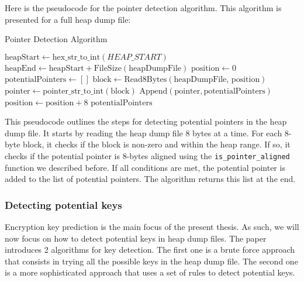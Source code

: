     Here is the pseudocode for the pointer detection algorithm. This algorithm is presented for a full heap dump file:

    \begin{algorithm}
        \caption{Pointer Detection Algorithm}
        \begin{algorithmic}[1]
            \State $\text{heapStart} \gets \text{hex\_str\_to\_int}(HEAP\_START)$
            \State $\text{heapEnd} \gets \text{heapStart} + \text{FileSize}(\text{heapDumpFile})$
            \State $\text{position} \gets 0$
            \State $\text{potentialPointers} \gets []$
                \State $\text{block} \gets \text{Read8Bytes}(\text{heapDumpFile, position})$
                    \State $\text{pointer} \gets \text{pointer\_str\_to\_int}(\text{block})$
                            \State $\text{Append}(\text{pointer}, \text{potentialPointers})$
                        \EndIf
                    \EndIf
                \EndIf
                \State $\text{position} \gets \text{position} + 8$
            \EndWhile
            \State \Return $\text{potentialPointers}$
        \EndProcedure
        \end{algorithmic}
    \end{algorithm}

    This pseudocode outlines the steps for detecting potential pointers in the heap dump file. It starts by reading the heap dump file 8 bytes at a time. For each 8-byte block, it checks if the block is non-zero and within the heap range. If so, it checks if the potential pointer is 8-bytes aligned using the \texttt{is\_pointer\_aligned} function we described before. If all conditions are met, the potential pointer is added to the list of potential pointers. The algorithm returns this list at the end.
    
    \subsubsection{Detecting potential keys}

    Encryption key prediction is the main focus of the present thesis. As such, we will now focus on how to detect potential keys in heap dump files. The paper  introduces 2 algorithms for key detection. The first one is a brute force approach that consists in trying all the possible keys in the heap dump file. The second one is a more sophisticated approach that uses a set of rules to detect potential keys.
    
